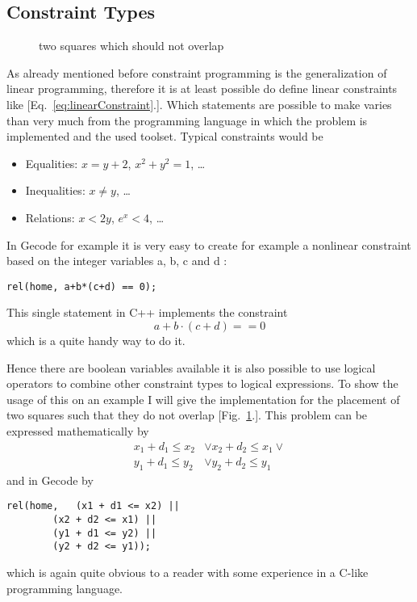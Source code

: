 \documentclass[10pt,
               a4paper,
               journal,
               ]{IEEEtran}
\newcommand{\reffig}[1]{{[Fig.~\ref{#1}.]}}
\newcommand{\refeq}[1]{{[Eq.~\ref{#1}.]}}
\begin{document}
	\subsection{Constraint Types}
	
	\begin{figure}
	\center
	\caption{two squares which should not overlap}
	\label{fig:squares}
	\end{figure}
	
	As already mentioned before constraint programming is the generalization of linear programming, therefore it is at least possible do define linear constraints like \refeq{eq:linearConstraint}. Which statements are possible to make varies than very much from the programming language in which the problem is implemented and the used toolset. Typical constraints would be
	\begin{itemize}
		\item Equalities: $x = y + 2$, $x^2 + y^2 = 1$, \dots
		\item Inequalities: $x \ne y$, \dots
		\item Relations: $x < 2 y$, $e^x < 4$, \dots
	\end{itemize}
	In Gecode for example it is very easy to create for example a nonlinear constraint based on the integer variables a, b, c and d \cite[p.~120]{programmingGecode}:
	\begin{lstlisting}
rel(home, a+b*(c+d) == 0);
	\end{lstlisting}
	This single statement in C++ implements the constraint
	\begin{equation}
		a + b \cdot (c + d) == 0
	\end{equation}
	which is a quite handy way to do it.
	
	Hence there are boolean variables available it is also possible to use logical operators to combine other constraint types to logical expressions. To show the usage of this on an example I will give the implementation for the placement of two squares such that they do not overlap \reffig{fig:squares}. This problem can be expressed mathematically by \cite[p. 101]{programmingGecode}
	\begin{equation}
	\begin{split}
		x_1 + d_1 \le x_2 & \lor x_2 + d_2 \le x_1 \lor \\
		y_1 + d_1 \le y_2 & \lor y_2 + d_2 \le y_1
	\end{split}
	\end{equation}
	and in Gecode by
	\begin{lstlisting}
rel(home,	(x1 + d1 <= x2) || 
		(x2 + d2 <= x1) || 
		(y1 + d1 <= y2) || 
		(y2 + d2 <= y1));
	\end{lstlisting}
	which is again quite obvious to a reader with some experience in a C-like programming language.	
	
\end{document}
